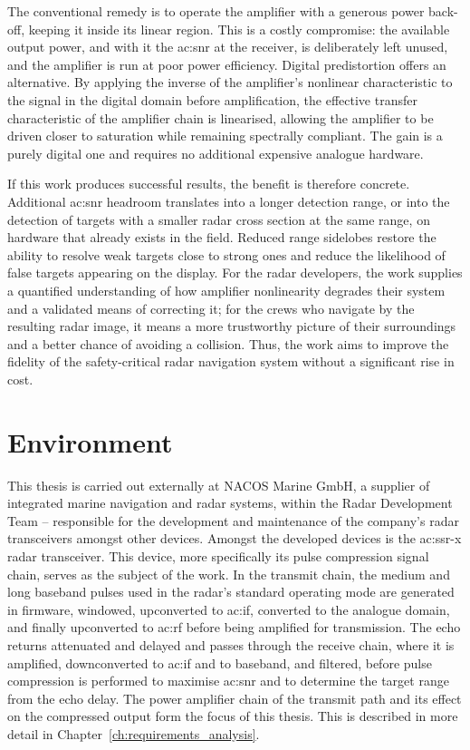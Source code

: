 The conventional remedy is to operate the amplifier with a generous power back-off, keeping it inside its linear region. This is a costly compromise: the available output power, and with it the \gls{ac:snr} at the receiver, is deliberately left unused, and the amplifier is run at poor power efficiency. Digital predistortion offers an alternative. By applying the inverse of the amplifier's nonlinear characteristic to the signal in the digital domain before amplification, the effective transfer characteristic of the amplifier chain is linearised, allowing the amplifier to be driven closer to saturation while remaining spectrally compliant. The gain is a purely digital one and requires no additional expensive analogue hardware.

If this work produces successful results, the benefit is therefore concrete. Additional \gls{ac:snr} headroom translates into a longer detection range, or into the detection of targets with a smaller radar cross section at the same range, on hardware that already exists in the field. Reduced range sidelobes restore the ability to resolve weak targets close to strong ones and reduce the likelihood of false targets appearing on the display. For the radar developers, the work supplies a quantified understanding of how amplifier nonlinearity degrades their system and a validated means of correcting it; for the crews who navigate by the resulting radar image, it means a more trustworthy picture of their surroundings and a better chance of avoiding a collision. Thus, the work aims to improve the fidelity of the safety-critical radar navigation system without a significant rise in cost.

\section{Environment}

This thesis is carried out externally at NACOS Marine GmbH, a supplier of integrated marine navigation and radar systems, within the Radar Development Team -- responsible for the development and maintenance of the company's radar transceivers amongst other devices. Amongst the developed devices is the \gls{ac:ssr-x} radar transceiver. This device, more specifically its pulse compression signal chain, serves as the subject of the work. In the transmit chain, the medium and long baseband pulses used in the radar's standard operating mode are generated in firmware, windowed, upconverted to \gls{ac:if}, converted to the analogue domain, and finally upconverted to \gls{ac:rf} before being amplified for transmission. The echo returns attenuated and delayed and passes through the receive chain, where it is amplified, downconverted to \gls{ac:if} and to baseband, and filtered, before pulse compression is performed to maximise \gls{ac:snr} and to determine the target range from the echo delay. The power amplifier chain of the transmit path and its effect on the compressed output form the focus of this thesis. This is described in more detail in Chapter~\ref{ch:requirements_analysis}.

